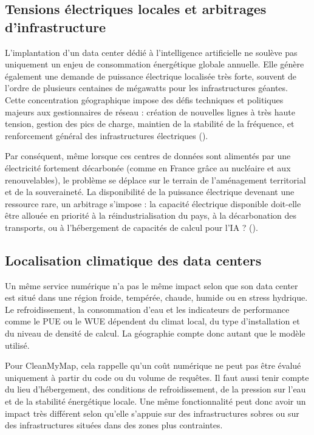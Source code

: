 \documentclass[
  10pt,
  a4paper,
  DIV=11,
  numbers=noendperiod,
  oneside]{scrreprt}
\begin{document}
\subsection{Tensions électriques locales et arbitrages
d'infrastructure}\label{tensions-uxe9lectriques-locales-et-arbitrages-dinfrastructure}

L'implantation d'un data center dédié à l'intelligence artificielle ne
soulève pas uniquement un enjeu de consommation énergétique globale
annuelle. Elle génère également une demande de puissance électrique
localisée très forte, souvent de l'ordre de plusieurs centaines de
mégawatts pour les infrastructures géantes. Cette concentration
géographique impose des défis techniques et politiques majeurs aux
gestionnaires de réseau : création de nouvelles lignes à très haute
tension, gestion des pics de charge, maintien de la stabilité de la
fréquence, et renforcement général des infrastructures électriques
().

Par conséquent, même lorsque ces centres de données sont alimentés par
une électricité fortement décarbonée (comme en France grâce au nucléaire
et aux renouvelables), le problème se déplace sur le terrain de
l'aménagement territorial et de la souveraineté. La disponibilité de la
puissance électrique devenant une ressource rare, un arbitrage s'impose
: la capacité électrique disponible doit-elle être allouée en priorité à
la réindustrialisation du pays, à la décarbonation des transports, ou à
l'hébergement de capacités de calcul pour l'IA ?
().

\subsection{Localisation climatique des data
centers}\label{localisation-climatique-des-data-centers}

Un même service numérique n'a pas le même impact selon que son data
center est situé dans une région froide, tempérée, chaude, humide ou en
stress hydrique. Le refroidissement, la consommation d'eau et les
indicateurs de performance comme le PUE ou le WUE dépendent du climat
local, du type d'installation et du niveau de densité de calcul. La
géographie compte donc autant que le modèle utilisé.

Pour CleanMyMap, cela rappelle qu'un coût numérique ne peut pas être
évalué uniquement à partir du code ou du volume de requêtes. Il faut
aussi tenir compte du lieu d'hébergement, des conditions de
refroidissement, de la pression sur l'eau et de la stabilité énergétique
locale. Une même fonctionnalité peut donc avoir un impact très différent
selon qu'elle s'appuie sur des infrastructures sobres ou sur des
infrastructures situées dans des zones plus contraintes.
\end{document}
